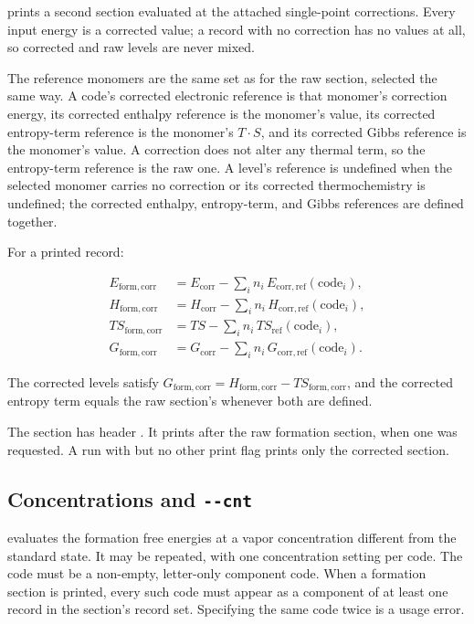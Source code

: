  prints a second section evaluated at the attached
single-point corrections. Every input energy is a corrected value; a record
with no correction has no values at all, so corrected and raw levels are
never mixed.

The reference monomers are the same set as for the raw section, selected the
same way. A code's corrected electronic reference is that monomer's
correction energy, its corrected enthalpy reference is the monomer's
 value, its corrected entropy-term reference is the monomer's
$T\cdot S$, and its corrected Gibbs reference is the monomer's 
value. A correction does not alter any thermal term, so the entropy-term
reference is the raw one. A level's reference is undefined when the selected
monomer carries no correction or its corrected thermochemistry is
undefined; the corrected enthalpy, entropy-term, and Gibbs references are
defined together.

For a printed record:

\begin{align}
E_{\mathrm{form,corr}} &= E_{\mathrm{corr}}
  - \sum_i n_i\,E_{\mathrm{corr,ref}}(\text{code}_i),\\
H_{\mathrm{form,corr}} &= H_{\mathrm{corr}}
  - \sum_i n_i\,H_{\mathrm{corr,ref}}(\text{code}_i),\\
T S_{\mathrm{form,corr}} &= T S
  - \sum_i n_i\,T S_{\mathrm{ref}}(\text{code}_i),\\
G_{\mathrm{form,corr}} &= G_{\mathrm{corr}}
  - \sum_i n_i\,G_{\mathrm{corr,ref}}(\text{code}_i).
\end{align}

The corrected levels satisfy $G_{\mathrm{form,corr}} = H_{\mathrm{form,corr}}
- T S_{\mathrm{form,corr}}$, and the corrected entropy term equals the raw
section's  whenever both are defined.

The section has header . It prints after
the raw formation section, when one was requested. A run with
 but no other print flag prints only the corrected
section.

\subsection{Concentrations and \texttt{-{}-cnt}}\label{sec:concentrations}

 evaluates the formation free energies at a vapor
concentration different from the standard state. It may be repeated, with
one concentration setting per code. The code must be a non-empty, letter-only
component code. When a formation section is printed, every such code must
appear as a component of at least one record in the section's record set.
Specifying the same code twice is a usage error.

